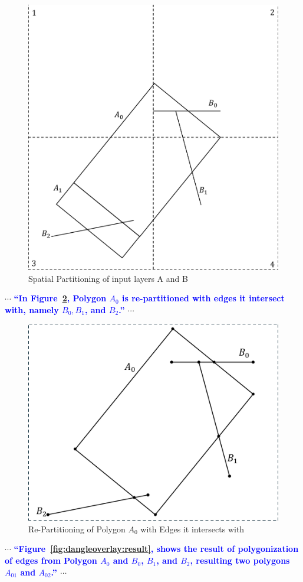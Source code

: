 \documentclass[10pt]{article}
\newcounter{figuremajor}
\newcommand*\setfigurecounter[1]{%
        \setcounter{figuremajor}{#1}%
}
\begin{document}
\setfigurecounter{14}
\begin{figure}[h!]
	\centering
	\includegraphics[width=0.5\linewidth ]{figures/DangleOverlay1.pdf}
	\caption[caption]{Spatial Partitioning of input layers A and B}
	\label{fig:dangleoverlay:input}
\end{figure}

$\cdots$
\textbf{\textcolor{blue}{
``In Figure~\ref{fig:dangleoverlay:inter}, Polygon $A_0$ is re-partitioned with edges it intersect with, namely $B_0, B_1$, and $B_2$.''
}}
$\cdots$

\setfigurecounter{15}
\begin{figure}[h!]
	\centering
	\includegraphics[width=0.55\linewidth ]{figures/DangleOverlay2.pdf}
	\caption[caption]{Re-Partitioning of Polygon $A_0$ with Edges it intersects with}
	\label{fig:dangleoverlay:inter}
\end{figure}

$\cdots$
\textbf{\textcolor{blue}{
``Figure~\ref{fig:dangleoverlay:result}, shows the result of polygonization of edges from Polygon $A_0$ and $B_0$, $B_1$, and $B_2$, resulting two polygons $A_01$ and $A_02$.''
}}
$\cdots$
\end{document}
